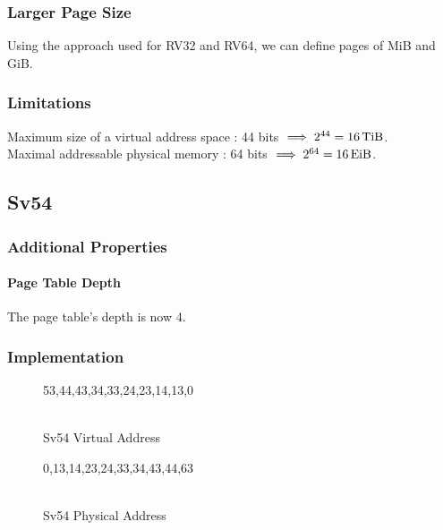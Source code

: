 \documentclass[a4paper]{article}
\newlength{\bitlabelwidth}
\newcommand{\rotbitheader}[1]{%
	\tiny
	\settowidth{\bitlabelwidth}{\quad 99}%
	\rotatebox[origin=B]{90}{\makebox[\bitlabelwidth][r]{#1}}%
}
\begin{document}
\subsubsection{Larger Page Size}
\noindent%
Using the approach used for RV32 and RV64, we can define pages of \unit[16]{MiB} and \unit[16]{GiB}.

\subsubsection{Limitations}
\noindent%
Maximum size of a virtual address space : 44 bits $\implies 2^{44} = \unit[16]{TiB}$.\\
Maximal addressable physical memory : 64 bits $\implies 2^{64} = \unit[16]{EiB}$.

\subsection{Sv54}
\subsubsection{Additional Properties}
\paragraph{Page Table Depth}
The page table's depth is now 4.
\subsubsection{Implementation}
\begin{figure}[H]
	\centering
	\begin{bytefield}[bitwidth=0.7em, endianness=big]{54}
		\bitheader[bitformatting=\rotbitheader]{53,44,43,34,33,24,23,14,13,0}\\
		\\
	\end{bytefield}
	\caption{Sv54 Virtual Address}
\end{figure}

\begin{figure}[H]
	\centering
	\begin{bytefield}[bitwidth=0.7em, endianness=big]{64}
		\bitheader[bitformatting=\rotbitheader]{0,13,14,23,24,33,34,43,44,63}\\
		\\
	\end{bytefield}
	\caption{Sv54 Physical Address}
\end{figure}
\end{document}

